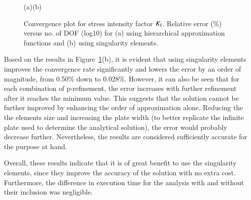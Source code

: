 \documentclass[review]{elsarticle}
\numberwithin{equation}{section}
\begin{document}
\begin{figure}[h]
	\centering
	
	\begin{minipage}{.45\textwidth}
		\hspace{-0.5cm}
	\end{minipage}%
	\quad \quad \quad
	\begin{minipage}{.45\textwidth}
		\vspace{-0.25cm}
	\end{minipage}
				\begin{centering} (a)\hspace{7cm}(b) \end{centering}
	\caption{Convergence plot for stress intensity factor $K_{\rm I}$. Relative error (\%) versus no. of DOF (log10) for (a) using hierarchical approximation functions and (b) using singularity elements.}
			\label{fig:plate_conv}
\end{figure}




Based on the results in Figure~\ref{fig:plate_conv}(b), it is evident that using singularity elements improves the convergence rate significantly and lowers the error by an order of magnitude, from 0.50\% down to 0.028\%. 
However, it can also be seen that for each combination of p-refinement, the error increases with further refinement after it reaches the minimum value. 
This suggests that the solution cannot be further improved by enhancing the order of approximation alone. 
Reducing the the elements size and increasing the plate width (to better replicate the infinite plate used to determine the analytical solution), the error would probably decrease further. 
Nevertheless, the results are considered sufficiently accurate for the purpose at hand. 

Overall, these results indicate that it is of great benefit to use the singularity elements, since they improve the accuracy of the solution with no extra cost.
Furthermore, the difference in execution time for the analysis with and without their inclusion was negligible. 
\end{document}
